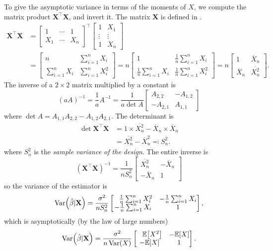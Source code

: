 \documentclass[letterpaper, reqno]{amsart}
\numberwithin{equation}{section}
\newcommand{\T}{\top} %
\newcommand{\vect}[1]{\boldsymbol{\mathbf{#1}}} %
\newcommand{\E}[1]{\mathbb{E}\mleft[#1\mright]}
\newcommand{\Var}[1]{\operatorname{Var}\mleft(#1\mright)}
\newcommand{\sumi}[2]{\sum_{#1=1}^{#2}}
\newcommand{\avg}[2]{\frac{1}{#2}\sumi{#1}{#2}}
\newcommand{\Xnbar}{\overline{X}_n}
\newcommand{\Xsqbar}{\overline{X_n^2}}
\newcommand{\Xm}{\vect{X}}
\newcommand{\Bvh}{\hat{\beta}}
\begin{document}
To give the asymptotic variance in terms of the moments of $X$, we compute the
matrix product $\Xm^\T\Xm$, and invert it. The matrix $\Xm$ is defined in
.
{\everymath{\displaystyle}
\begin{align*}
  \Xm^\T \Xm &=
  \begin{bmatrix} 
    1   & \cdots & 1   \\
    X_1 & \cdots & X_n
  \end{bmatrix}^\T
  \begin{bmatrix} 
    1      & X_1    \\
    \vdots & \vdots \\
    1      & X_n
  \end{bmatrix} \\
  &=
  \begin{bmatrix}
    n               & \sumi{i}{n} X_i   \\
    \sumi{i}{n} X_i & \sumi{i}{n} X_i^2
  \end{bmatrix}
  =
  n
  \begin{bmatrix}
    1              & \avg{i}{n} X_i   \\
    \avg{i}{n} X_i & \avg{i}{n} X_i^2
  \end{bmatrix}
  =
  n
  \begin{bmatrix}
    1      & \Xnbar   \\
    \Xnbar & \Xsqbar
  \end{bmatrix}.
\end{align*}
}
The inverse of a $2 \times 2$ matrix multiplied by a constant is
\[ (a A)^{-1} = \frac{1}{a} A^{-1} = \frac{1}{a \det A} 
  \begin{bmatrix}
     A_{2,2} & -A_{1,2} \\
    -A_{2,1} &  A_{1,1}
  \end{bmatrix} 
\]
where $\det A = A_{1,1}A_{2,2} - A_{1,2}A_{2,1}$.
The determinant is
\begin{align*}
  \det \Xm^\T \Xm &= 1 \times \Xsqbar - \Xnbar \times \Xnbar \\
  &= \Xsqbar - \Xnbar^2 \eqqcolon S_n^2.
\end{align*}
where $S_n^2$ is the \emph{sample variance of the design}.
The entire inverse is
\[ (\Xm^\T \Xm)^{-1} = \frac{1}{n S_n^2}
  \begin{bmatrix}
    \Xsqbar & -\Xnbar \\
    -\Xnbar & 1
  \end{bmatrix}
\]
so the variance of the estimator is
{\everymath{\displaystyle}
\[ \Var{\Bvh|\Xm} = \frac{\sigma^2}{n S_n^2}
  \begin{bmatrix}
    \phantom{-}\avg{i}{n} X_i^2 & -\avg{i}{n}X_i \\
    -\avg{i}{n}X_i   & 1
  \end{bmatrix},
\] which is asymptotically (by the law of large numbers)
\[ \Var{\Bvh|\Xm} = \frac{\sigma^2}{n \Var{X}}
  \begin{bmatrix}
    \phantom{-}\E{X^2}  & -\E{X} \\
    -\E{X}              & 1
  \end{bmatrix}.
\]
}
\end{document}
